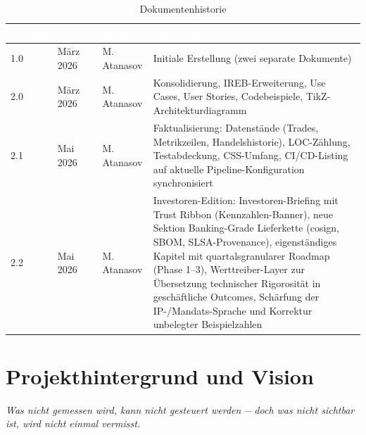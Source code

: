 \documentclass[11pt, a4paper, oneside, openany]{report}
\begin{document}
\vspace{1cm}
\begin{table}[H]
\centering
\caption{Dokumentenhistorie}
\sffamily\small
{}
\begin{tabularx}{\textwidth}{l l l X}
  \toprule
  \rowcolor{DeepNavy} \textcolor{white}{\textbf{Version}} & \textcolor{white}{\textbf{Datum}} & \textcolor{white}{\textbf{Autor}} & \textcolor{white}{\textbf{Änderung}} \\
  \midrule
  1.0 & März 2026 & M.\,Atanasov & Initiale Erstellung (zwei separate Dokumente) \\
  2.0 & März 2026 & M.\,Atanasov & Konsolidierung, IREB-Erweiterung, Use Cases, User Stories, Codebeispiele, TikZ-Architekturdiagramm \\
  2.1 & Mai 2026  & M.\,Atanasov & Faktualisierung: Datenstände (Trades, Metrikzeilen, Handelshistorie), LOC-Zählung, Testabdeckung, CSS-Umfang, CI/CD-Listing auf aktuelle Pipeline-Konfiguration synchronisiert \\
  2.2 & Mai 2026  & M.\,Atanasov & Investoren-Edition: Investoren-Briefing mit Trust Ribbon (Kennzahlen-Banner), neue Sektion Banking-Grade Lieferkette (cosign, SBOM, SLSA-Provenance), eigenständiges Kapitel mit quartalsgranularer Roadmap (Phase 1--3), Werttreiber-Layer zur Übersetzung technischer Rigorosität in geschäftliche Outcomes, Schärfung der IP-/Mandats-Sprache und Korrektur unbelegter Beispielzahlen \\
  \bottomrule
\end{tabularx}
\end{table}

\tableofcontents
\clearpage
\listoftables
\clearpage
\listoffigures
\clearpage

\setcounter{page}{1}

\chapter{Projekthintergrund und Vision}
\label{ch:hintergrund}

\epigraph{\itshape Was nicht gemessen wird, kann nicht gesteuert werden\,---\,doch was nicht sichtbar ist, wird nicht einmal vermisst.}{}
\end{document}
